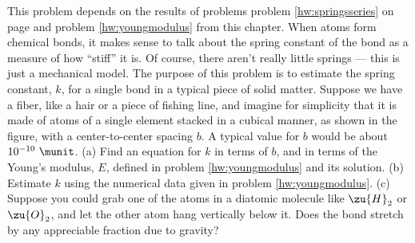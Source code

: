 This problem depends on the results of problems problem \ref{hw:springsseries}
        on page \pageref{hw:springsseries} and
        problem \ref{hw:youngmodulus} from this chapter. When atoms
        form chemical bonds, it makes sense to talk about the spring
        constant of the bond as a measure of how ``stiff'' it is. Of
        course, there aren't really little springs --- this is just a
        mechanical model. The purpose of this problem is to estimate
        the spring constant, $k$, for a single bond in a typical piece
        of solid matter. Suppose we have a fiber, like a hair or a
        piece of fishing line, and imagine for simplicity that it is
        made of atoms of a single element stacked in a cubical
        manner, as shown in the figure, with a center-to-center
        spacing $b$. A typical value for $b$ would be about $10^{-10}\ \munit$.\hwendpart
        (a) Find an equation for $k$ in terms of $b$, and in terms of
        the Young's modulus, $E$, defined in problem \ref{hw:youngmodulus} and its
        solution. \hwendpart
        (b) Estimate $k$ using the numerical data given in
        problem \ref{hw:youngmodulus}. \hwendpart
        (c) Suppose you could grab one of the atoms in a
        diatomic molecule like $\zu{H}_2$ or $\zu{O}_2$, and let the other atom hang
        vertically below it. Does the bond stretch by any
        appreciable fraction due to gravity?
